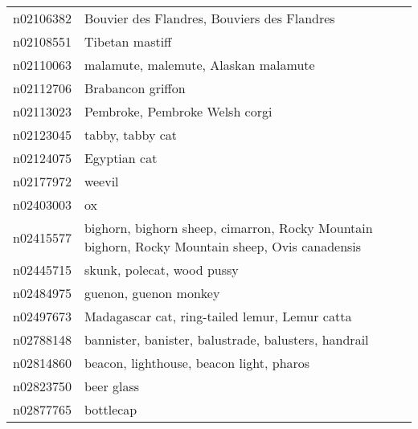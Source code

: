 \begin{appendices}
\begin{longtabu}{X|X[4]}
    		n02106382 &                                                                                Bouvier des Flandres, Bouviers des Flandres \tabularnewline
    		n02108551 &                                                                                                            Tibetan mastiff \tabularnewline
    		n02110063 &                                                                                       malamute, malemute, Alaskan malamute \tabularnewline
    		n02112706 &                                                                                                          Brabancon griffon \tabularnewline
    		n02113023 &                                                                                             Pembroke, Pembroke Welsh corgi \tabularnewline
    		n02123045 &                                                                                                           tabby, tabby cat \tabularnewline
    		n02124075 &                                                                                                               Egyptian cat \tabularnewline
    		n02177972 &                                                                                                                     weevil \tabularnewline
    		n02403003 &                                                                                                                         ox \tabularnewline
    		n02415577 &                            bighorn, bighorn sheep, cimarron, Rocky Mountain bighorn, Rocky Mountain sheep, Ovis canadensis \tabularnewline
    		n02445715 &                                                                                                 skunk, polecat, wood pussy \tabularnewline
    		n02484975 &                                                                                                      guenon, guenon monkey \tabularnewline
    		n02497673 &                                                                             Madagascar cat, ring-tailed lemur, Lemur catta \tabularnewline
    		n02788148 &                                                                       bannister, banister, balustrade, balusters, handrail \tabularnewline
    		n02814860 &                                                                                   beacon, lighthouse, beacon light, pharos \tabularnewline
    		n02823750 &                                                                                                                 beer glass \tabularnewline
    		n02877765 &                                                                                                                  bottlecap \tabularnewline

\end{longtabu}
\end{appendices}

